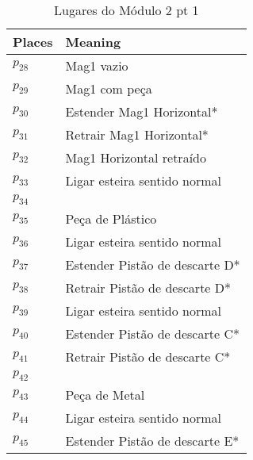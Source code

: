 \begin{table}[htbp]
\caption{Lugares do Módulo 2 pt 1}
\centering
\begin{tabular}{ll}
Places & Meaning\\
\hline
\hyperlink{partialNet:p28}{\hypertarget{partialTable:p28}{$p_{28}$}} & Mag1 vazio\\
\hyperlink{partialNet:p29}{\hypertarget{partialTable:p29}{$p_{29}$}} & Mag1 com peça\\
\hyperlink{partialNet:p30}{\hypertarget{partialTable:p30}{$p_{30}$}} & Estender Mag1 Horizontal*\\
\hyperlink{partialNet:p31}{\hypertarget{partialTable:p31}{$p_{31}$}} & Retrair Mag1 Horizontal*\\
\hyperlink{partialNet:p32}{\hypertarget{partialTable:p32}{$p_{32}$}} & Mag1 Horizontal retraído\\
\hyperlink{partialNet:p33}{\hypertarget{partialTable:p33}{$p_{33}$}} & Ligar esteira sentido normal\\
\hyperlink{partialNet:p34}{\hypertarget{partialTable:p34}{$p_{34}$}} & \\
\hyperlink{partialNet:p35}{\hypertarget{partialTable:p35}{$p_{35}$}} & Peça de Plástico\\
\hyperlink{partialNet:p36}{\hypertarget{partialTable:p36}{$p_{36}$}} & Ligar esteira sentido normal\\
\hyperlink{partialNet:p37}{\hypertarget{partialTable:p37}{$p_{37}$}} & Estender Pistão de descarte D*\\
\hyperlink{partialNet:p38}{\hypertarget{partialTable:p38}{$p_{38}$}} & Retrair Pistão de descarte D*\\
\hyperlink{partialNet:p39}{\hypertarget{partialTable:p39}{$p_{39}$}} & Ligar esteira sentido normal\\
\hyperlink{partialNet:p40}{\hypertarget{partialTable:p40}{$p_{40}$}} & Estender Pistão de descarte C*\\
\hyperlink{partialNet:p41}{\hypertarget{partialTable:p41}{$p_{41}$}} & Retrair Pistão de descarte C*\\
\hyperlink{partialNet:p42}{\hypertarget{partialTable:p42}{$p_{42}$}} & \\
\hyperlink{partialNet:p43}{\hypertarget{partialTable:p43}{$p_{43}$}} & Peça de Metal\\
\hyperlink{partialNet:p44}{\hypertarget{partialTable:p44}{$p_{44}$}} & Ligar esteira sentido normal\\
\hyperlink{partialNet:p45}{\hypertarget{partialTable:p45}{$p_{45}$}} & Estender Pistão de descarte E*\\

\end{tabular}
\end{table}
